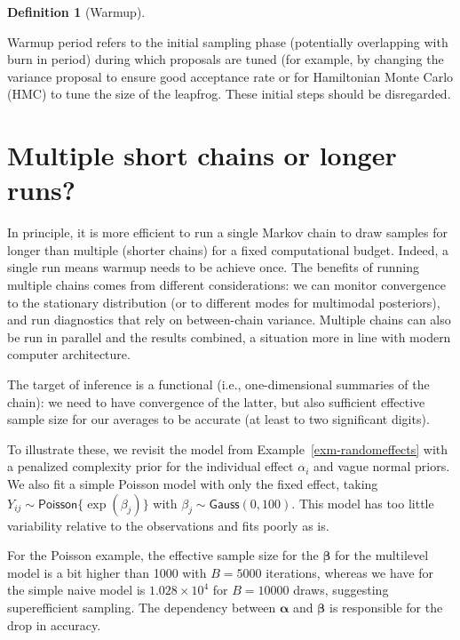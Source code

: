 \documentclass[
  11pt,
  letterpaper,
]{scrbook}
\theoremstyle{plain}
\theoremstyle{plain}
\theoremstyle{plain}
\theoremstyle{definition}
\theoremstyle{definition}
\theoremstyle{definition}
\newtheorem{definition}{Definition}[chapter]
\theoremstyle{remark}
\begin{document}
\begin{definition}[Warmup]\protect\hypertarget{def-warmup}{}\label{def-warmup}

Warmup period refers to the initial sampling phase (potentially
overlapping with burn in period) during which proposals are tuned (for
example, by changing the variance proposal to ensure good acceptance
rate or for Hamiltonian Monte Carlo (HMC) to tune the size of the
leapfrog. These initial steps should be disregarded.

\end{definition}

\label{rmk-short-vs-long}
\section{Multiple short chains or longer
runs?}\label{multiple-short-chains-or-longer-runs}

In principle, it is more efficient to run a single Markov chain to draw
samples for longer than multiple (shorter chains) for a fixed
computational budget. Indeed, a single run means warmup needs to be
achieve once. The benefits of running multiple chains comes from
different considerations: we can monitor convergence to the stationary
distribution (or to different modes for multimodal posteriors), and run
diagnostics that rely on between-chain variance. Multiple chains can
also be run in parallel and the results combined, a situation more in
line with modern computer architecture.

The target of inference is a functional (i.e., one-dimensional summaries
of the chain): we need to have convergence of the latter, but also
sufficient effective sample size for our averages to be accurate (at
least to two significant digits).

To illustrate these, we revisit the model from
Example~\ref{exm-randomeffects} with a penalized complexity prior for
the individual effect \(\alpha_i\) and vague normal priors. We also fit
a simple Poisson model with only the fixed effect, taking
\(Y_{ij} \sim \mathsf{Poisson}\{\exp(\beta_j)\}\) with
\(\beta_j \sim \mathsf{Gauss}(0,100)\). This model has too little
variability relative to the observations and fits poorly as is.

For the Poisson example, the effective sample size for the
\(\boldsymbol{\beta}\) for the multilevel model is a bit higher than
1000 with \(B=5000\) iterations, whereas we have for the simple naive
model is \(\ensuremath{1.028\times 10^{4}}\) for \(B=10000\) draws,
suggesting superefficient sampling. The dependency between
\(\boldsymbol{\alpha}\) and \(\boldsymbol{\beta}\) is responsible for
the drop in accuracy.
\end{document}
